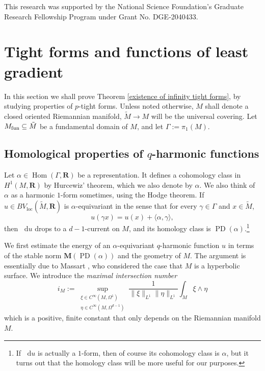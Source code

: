 \documentclass[reqno,11pt]{amsart}
\newcommand{\RR}{\mathbf{R}}
\newcommand*\dif{\mathop{}\!\mathrm{d}}
\DeclareMathOperator{\Hom}{Hom}
\DeclareMathOperator{\PD}{PD}
\newcommand{\Mass}{\mathbf M}
\newcommand{\dfn}[1]{\emph{#1}\index{#1}}
\newcommand{\loc}{\mathrm{loc}}
\theoremstyle{definition}
\numberwithin{equation}{section}
\begin{document}
This research was supported by the National Science Foundation's Graduate Research Fellowship Program under Grant No. DGE-2040433.



\section{Tight forms and functions of least gradient}\label{tight forms sec}
In this section we shall prove Theorem \ref{existence of infinity tight forms}, by studying properties of $p$-tight forms.
Unless noted otherwise, $M$ shall denote a closed oriented Riemannian manifold, $\tilde M \to M$ will be the universal covering.
Let $M_{\rm fun} \subseteq \tilde M$ be a fundamental domain of $M$, and let $\Gamma := \pi_1(M)$.


\subsection{Homological properties of \texorpdfstring{$q$-harmonic}{q-harmonic} functions}
Let $\alpha \in \Hom(\Gamma, \RR)$ be a representation.
It defines a cohomology class in $H^1(M, \RR)$ by Hurcewiz' theorem, which we also denote by $\alpha$.
We also think of $\alpha$ as a harmonic $1$-form sometimes, using the Hodge theorem.
If $u \in BV_\loc(\tilde M, \RR)$ is $\alpha$-equivariant in the sense that for every $\gamma \in \Gamma$ and $x \in \tilde M$,
$$u(\gamma x) = u(x) + \langle \alpha, \gamma\rangle,$$
then $\dif u$ drops to a $d - 1$-current on $M$, and its homology class is $\PD(\alpha)$.\footnote{If $\dif u$ is actually a $1$-form, then of course its cohomology class is $\alpha$, but it turns out that the homology class will be more useful for our purposes.}

We first estimate the energy of an $\alpha$-equivariant $q$-harmonic function $u$ in terms of the stable norm $\Mass(\PD(\alpha))$ and the geometry of $M$.
The argument is essentially due to Massart \cite[\S4.2]{Massart96}, who considered the case that $M$ is a hyperbolic surface.
We introduce the \dfn{maximal intersection number}
$$i_M := \sup_{\substack{\xi \in C^\infty(M, \Omega^1) \\ \eta \in C^\infty(M, \Omega^{d - 1})}} \frac{1}{\|\xi\|_{L^1} \|\eta\|_{L^1}} \int_M \xi \wedge \eta$$
which is a positive, finite constant that only depends on the Riemannian manifold $M$.
\end{document}
